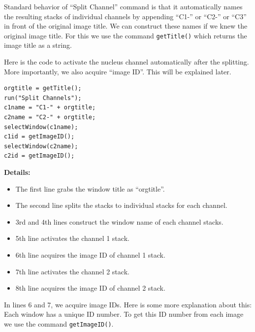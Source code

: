 \documentclass[11pt,a4paper,oneside]{report}
\newenvironment{indentCom}
{\begin{list}{}
         {\setlength{\leftmargin}{1em}}
         \item[]
}
{\end{list}}
\newcommand{\ilcom}[1]{\texttt{\small#1}}
\begin{document}
Standard behavior of ``Split Channel'' command is that it automatically names the resulting stacks of individual channels by appending ``C1-'' or ``C2-'' or ``C3'' in front of the original image title. We can construct these names if we knew the original image title. For this we use the command \ilcom{getTitle()} which returns the image title as a string. 


Here is the code to activate the nucleus channel automatically after the splitting. More importantly, we also acquire ``image ID''. This will be explained later.  

\begin{lstlisting}
orgtitle = getTitle();
run("Split Channels");
c1name = "C1-" + orgtitle;
c2name = "C2-" + orgtitle;
selectWindow(c1name);
c1id = getImageID();
selectWindow(c2name);
c2id = getImageID();
\end{lstlisting}

\textbf{Details:} 
\begin{itemize}
\item The first line grabs the window title as ``orgtitle''. 
\item The second line splits the stacks to individual stacks for each channel.
\item 3rd and 4th lines construct the window name of each channel stacks. 
\item 5th line activates the channel 1 stack. 
\item 6th line acquires the image ID of channel 1 stack. 
\item 7th line activates the channel 2 stack. 
\item 8th line acquires the image ID of channel 2 stack. 
\end{itemize}


In lines 6 and 7, we acquire image IDs. Here is some more explanation about this: Each window has a unique ID number. To get this ID number from each image we use the command \ilcom{getImageID()}.

\begin{indentCom}
\end{indentCom}
\end{document}
